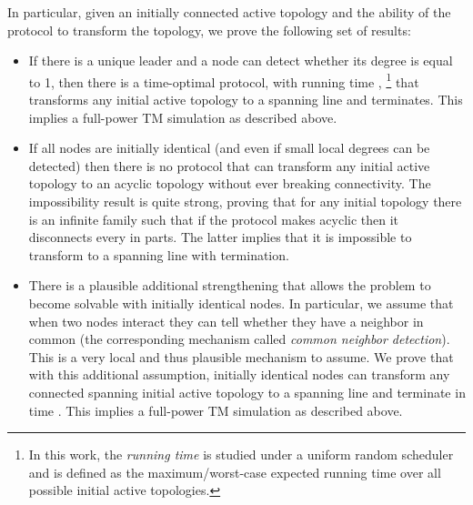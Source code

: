\documentclass[preprint]{elsarticle}
\begin{document}
In particular, given an initially connected active topology and the ability of the protocol to transform the topology, we prove the following set of results:
\begin{itemize}
\item If there is a unique leader and a node can detect whether its degree is equal to 1, then there is a time-optimal protocol, with running time , \footnote{In this work, the \emph{running time} is studied under a uniform random scheduler and is defined as the maximum/worst-case expected running time over all possible initial active topologies.} that transforms any initial active topology to a spanning line and terminates.
This implies a full-power TM simulation as described above.
\item If all nodes are initially identical (and even if small local degrees can be detected) then there is no protocol that can transform any initial active topology to an acyclic topology without ever breaking connectivity. The impossibility result is quite strong, proving that for any initial topology  there is an infinite family  such that if the protocol makes  acyclic then it disconnects every  in  parts. The latter implies that it is impossible to transform to a spanning line with termination.
\item There is a plausible additional strengthening that allows the problem to become solvable with initially identical nodes. In particular, we assume that when two nodes interact they can tell whether they have a neighbor in common (the corresponding mechanism called \emph{common neighbor detection}). This is a very local and thus plausible mechanism to assume. We prove that with this additional assumption, initially identical nodes can transform any connected spanning initial active topology to a spanning line and terminate in time . This implies a full-power TM simulation as described above.
\end{itemize}
\end{document}
